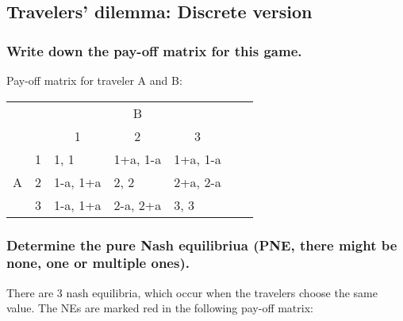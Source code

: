 \documentclass[11pt]{article}
\begin{document}
    \subsection{Travelers’ dilemma: Discrete version}

    \subsubsection{Write down the pay-off matrix for this game.}
    Pay-off matrix for traveler A and B:
    \begin{table}[h]
        \centering
        \begin{tabular}{lllllll}
            & & \multicolumn{3}{c}{B} & & \\
            &                        & \multicolumn{1}{c}{1}         & \multicolumn{1}{c}{2}         & \multicolumn{1}{c}{3}         & & \\ \cline{3-5}
            \multirow{3}{*}{A} & \multicolumn{1}{r|}{1} & \multicolumn{1}{l|}{1, 1}     & \multicolumn{1}{l|}{1+a, 1-a} & \multicolumn{1}{l|}{1+a, 1-a} &  &  \\ \cline{3-5}
            & \multicolumn{1}{l|}{2} & \multicolumn{1}{l|}{1-a, 1+a} & \multicolumn{1}{l|}{2, 2}     & \multicolumn{1}{l|}{2+a, 2-a} & & \\ \cline{3-5}
            & \multicolumn{1}{l|}{3} & \multicolumn{1}{l|}{1-a, 1+a} & \multicolumn{1}{l|}{2-a, 2+a} & \multicolumn{1}{l|}{3, 3} & & \\ \cline{3-5}
        \end{tabular}
    \end{table}

    \subsubsection{Determine the pure Nash equilibriua (PNE, there might be none, one or multiple ones).}
    There are 3 nash equilibria, which occur when the travelers choose the same value. The NEs are marked red in the following pay-off matrix:
\end{document}
